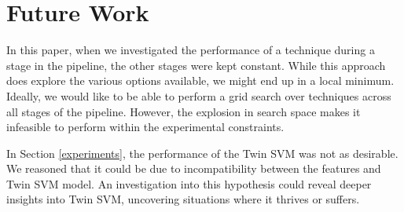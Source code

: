 \documentclass{article}
\begin{document}
\section{Future Work}

In this paper, when we investigated the performance of a technique during a stage in the pipeline, the other stages were kept constant. While this approach does explore the various options available, we might end up in a local minimum. Ideally, we would like to be able to perform a grid search over techniques across all stages of the pipeline. However, the explosion in search space makes it infeasible to perform within the experimental constraints. 

In Section \ref{experiments}, the performance of the Twin SVM was not as desirable. We reasoned that it could be due to incompatibility between the features and Twin SVM model. An investigation into this hypothesis could reveal deeper insights into Twin SVM, uncovering situations where it thrives or suffers. 
\end{document}
